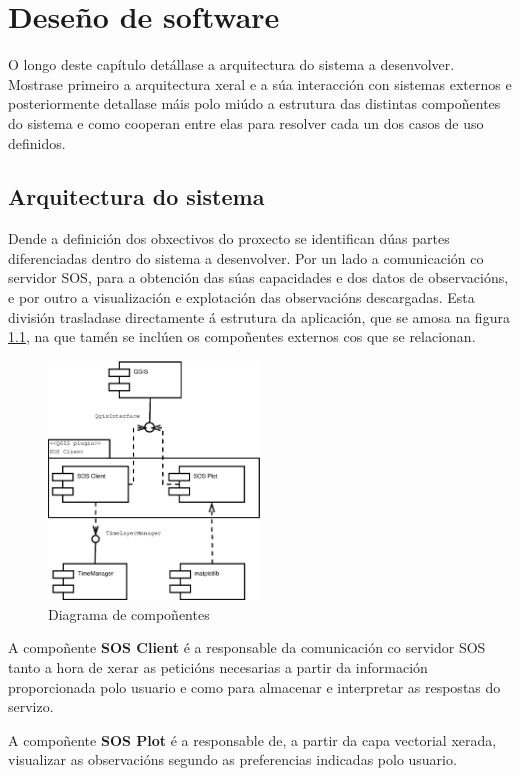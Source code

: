 \chapter{Deseño de software}
O longo deste capítulo detállase a arquitectura do sistema a desenvolver. Mostrase primeiro a arquitectura xeral e a súa interacción con sistemas externos e posteriormente detallase máis polo miúdo a estrutura das distintas compoñentes do sistema e como cooperan entre elas para resolver cada un dos casos de uso definidos.

\section{Arquitectura do sistema}
Dende a definición dos obxectivos do proxecto se identifican dúas partes diferenciadas dentro do sistema a desenvolver. Por un lado a comunicación co servidor SOS, para a obtención das súas capacidades e dos datos de observacións, e por outro a visualización e explotación das observacións descargadas. Esta división trasladase directamente á estrutura da aplicación, que se amosa na figura \ref{fig:diaComponentes}, na que tamén se inclúen os compoñentes externos cos que se relacionan.

\begin{figure}[hbtp]
 \centering
 \includegraphics[width=0.5\textwidth]{images/componentes.eps}
 \caption{Diagrama de compoñentes}
 \label{fig:diaComponentes}
\end{figure}

A compoñente \textbf{SOS Client} é a responsable da comunicación co servidor SOS tanto a hora de xerar as peticións necesarias a partir da información proporcionada polo usuario e como para almacenar e interpretar as respostas do servizo.

A compoñente \textbf{SOS Plot} é a responsable de, a partir da capa vectorial xerada, visualizar as observacións segundo as preferencias indicadas polo usuario.

